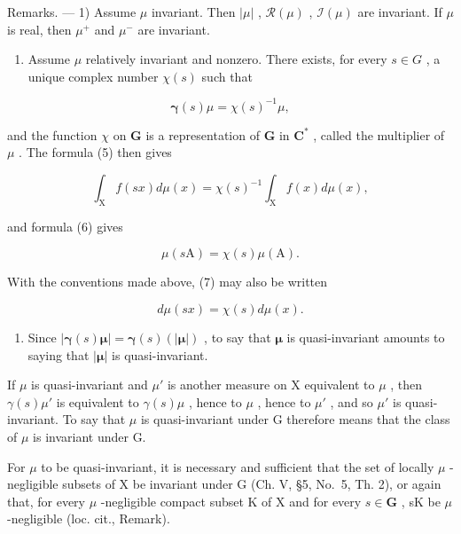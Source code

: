 Remarks. --- 1) Assume \(\mu\) invariant. Then \(|\mu|\) , \(\mathcal{R}(\mu)\) , \(\mathcal{I}(\mu)\) are invariant. If \(\mu\) is real, then \(\mu^{+}\) and \(\mu^{-}\) are invariant.

\begin{enumerate}
\def\labelenumi{\arabic{enumi})}
\setcounter{enumi}{1}
\tightlist
\item
  Assume \(\mu\) relatively invariant and nonzero. There exists, for every \(s \in G\) , a unique complex number \(\chi(s)\) such that
\end{enumerate}

\[
\boldsymbol {\gamma} (s) \mu = \chi (s) ^ {- 1} \mu ,\tag{7}
\]

and the function \(\chi\) on \(\mathbf{G}\) is a representation of \(\mathbf{G}\) in \(\mathbf{C}^*\) , called the multiplier of \(\mu\) . The formula (5) then gives

\[
\int_ {\mathrm{X}} f (s x) d \mu (x) = \chi (s) ^ {- 1} \int_ {\mathrm{X}} f (x) d \mu (x),\tag{8}
\]

and formula (6) gives

\[
\mu (s \mathrm{A}) = \chi (s) \mu (\mathrm{A}).\tag{9}
\]

With the conventions made above, (7) may also be written

\[
d \mu (s x) = \chi (s) d \mu (x).\tag{10}
\]

\begin{enumerate}
\def\labelenumi{\arabic{enumi})}
\setcounter{enumi}{2}
\tightlist
\item
  Since \(|\pmb{\gamma}(s)\pmb{\mu}| = \pmb{\gamma}(s)(|\pmb{\mu}|)\) , to say that \(\pmb{\mu}\) is quasi-invariant amounts to saying that \(|\pmb{\mu}|\) is quasi-invariant.
\end{enumerate}

If \(\mu\) is quasi-invariant and \(\mu'\) is another measure on X equivalent to \(\mu\) , then \(\gamma(s)\mu'\) is equivalent to \(\gamma(s)\mu\) , hence to \(\mu\) , hence to \(\mu'\) , and so \(\mu'\) is quasi-invariant. To say that \(\mu\) is quasi-invariant under G therefore means that the class of \(\mu\) is invariant under G.

For \(\mu\) to be quasi-invariant, it is necessary and sufficient that the set of locally \(\mu\) -negligible subsets of X be invariant under G (Ch. V, §5, No.~5, Th. 2), or again that, for every \(\mu\) -negligible compact subset K of X and for every \(s \in \mathbf{G}\) , sK be \(\mu\) -negligible (loc. cit., Remark).

